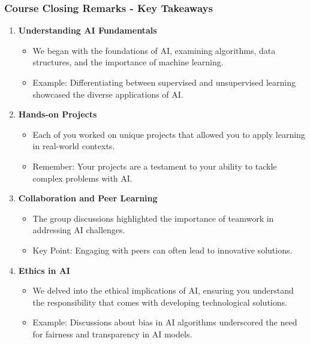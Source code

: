 \documentclass[aspectratio=169]{beamer}
\begin{document}
\begin{frame}[fragile]
    \frametitle{Course Closing Remarks - Key Takeaways}
    \begin{enumerate}
        \item \textbf{Understanding AI Fundamentals} 
        \begin{itemize}
            \item We began with the foundations of AI, examining algorithms, data structures, and the importance of machine learning.
            \item Example: Differentiating between supervised and unsupervised learning showcased the diverse applications of AI.
        \end{itemize}
        
        \item \textbf{Hands-on Projects} 
        \begin{itemize}
            \item Each of you worked on unique projects that allowed you to apply learning in real-world contexts.
            \item Remember: Your projects are a testament to your ability to tackle complex problems with AI.
        \end{itemize}
        
        \item \textbf{Collaboration and Peer Learning} 
        \begin{itemize}
            \item The group discussions highlighted the importance of teamwork in addressing AI challenges.
            \item Key Point: Engaging with peers can often lead to innovative solutions.
        \end{itemize}
        
        \item \textbf{Ethics in AI} 
        \begin{itemize}
            \item We delved into the ethical implications of AI, ensuring you understand the responsibility that comes with developing technological solutions.
            \item Example: Discussions about bias in AI algorithms underscored the need for fairness and transparency in AI models.
        \end{itemize}
    \end{enumerate}
\end{frame}
\end{document}
